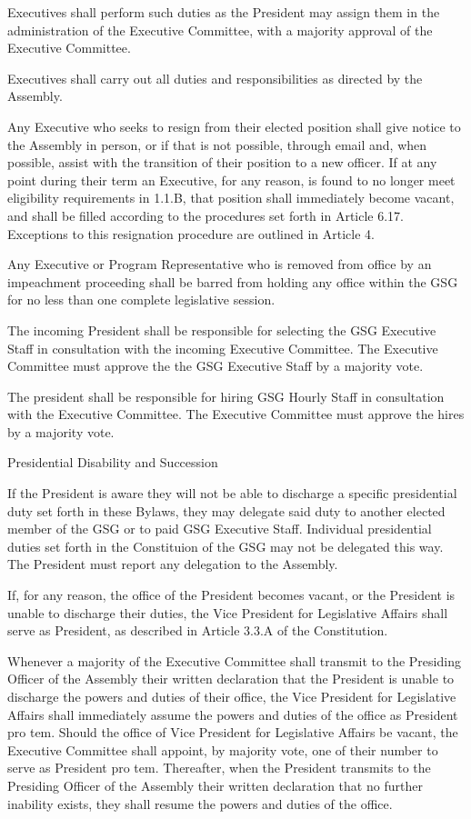 \begin{bylaws-number}
  \item Executives shall perform such duties as the President may assign them in the administration of the Executive Committee, with a majority approval of the Executive Committee.
  \item Executives shall carry out all duties and responsibilities as directed by the Assembly.
  \item Any Executive who seeks to resign from their elected position shall give notice to the Assembly in person, or if that is not possible, through email and, when possible, assist with the transition of their position to a new officer. If at any point during their term an Executive, for any reason, is found to no longer meet eligibility requirements in 1.1.B, that position shall immediately become vacant, and shall be filled according to the procedures set forth in Article 6.17. Exceptions to this resignation procedure are outlined in Article 4.
  \item Any Executive or Program Representative who is removed from office by an impeachment proceeding shall be barred from holding any office within the GSG for no less than one complete legislative session.
  \item The incoming President shall be responsible for selecting the GSG Executive Staff in consultation with the incoming Executive Committee. The Executive Committee must approve the the GSG Executive Staff by a majority vote.
  \item The president shall be responsible for hiring GSG Hourly Staff in consultation with the Executive Committee. The Executive Committee must approve the hires by a majority vote.
  \item Presidential Disability and Succession
  \begin{bylaws-number}
  	\item If the President is aware they will not be able to discharge a specific presidential duty set forth in these Bylaws, they may delegate said duty to another elected member of the GSG or to paid GSG Executive Staff. Individual presidential duties set forth in the Constituion of the GSG may not be delegated this way. The President must report any delegation to the Assembly.
    \item If, for any reason, the office of the President becomes vacant, or the President is unable to discharge their duties, the Vice President for Legislative Affairs shall serve as President, as described in Article 3.3.A of the Constitution.
    \item Whenever a majority of the Executive Committee shall transmit to the Presiding Officer of the Assembly their written declaration that the President is unable to discharge the powers and duties of their office, the Vice President for Legislative Affairs shall immediately assume the powers and duties of the office as President pro tem. Should the office of Vice President for Legislative Affairs be vacant, the Executive Committee shall appoint, by majority vote, one of their number to serve as President pro tem. Thereafter, when the President transmits to the Presiding Officer of the Assembly their written declaration that no further inability exists, they shall resume the powers and duties of the office.

\end{bylaws-number}
\end{bylaws-number}
